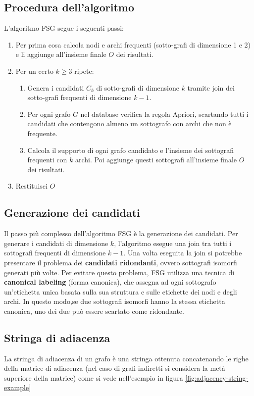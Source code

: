 \subsection{Procedura dell'algoritmo}
L'algoritmo FSG segue i seguenti passi:
\begin{enumerate}
    \item Per prima cosa calcola nodi e archi frequenti (sotto-grafi di dimensione 1 e 2) e li aggiunge all'insieme finale $O$ dei risultati.
    \item Per un certo $k \ge 3$ ripete:
    \begin{enumerate}
        \item Genera i candidati $C_k$ di sotto-grafi di dimensione $k$ tramite join dei sotto-grafi frequenti di dimensione $k-1$.
        \item Per ogni grafo $G$ nel database verifica la regola Apriori, scartando tutti i candidati che contengono almeno un sottografo con archi che non è frequente.
        \item Calcola il supporto di ogni grafo candidato e l'insieme dei sottografi frequenti con $k$ archi. Poi aggiunge  questi sottografi all'insieme finale $O$ dei risultati.
    \end{enumerate}
    \item Restituisci $O$
\end{enumerate}

\subsection{Generazione dei candidati}
Il passo più complesso dell'algoritmo FSG è la generazione dei candidati. Per generare i candidati di dimensione $k$, l'algoritmo esegue una join tra tutti i sottografi frequenti di dimensione $k-1$. Una volta eseguita la join si potrebbe presentare il problema dei \textbf{candidati ridondanti}, ovvero sottografi isomorfi generati più volte. Per evitare questo problema, FSG utilizza una tecnica di \textbf{canonical labeling} (forma canonica), che assegna ad ogni sottografo un'etichetta unica basata sulla sua struttura e sulle etichette dei nodi e degli archi. In questo modo,se due sottografi isomorfi hanno la stessa etichetta canonica, uno dei due può essere scartato come ridondante.

\subsection{Stringa di adiacenza}
La stringa di adiacenza di un grafo è una stringa ottenuta concatenando le righe della matrice di adiacenza (nel caso di grafi indiretti si considera la metà superiore della matrice) come si vede nell'esempio in figura \ref{fig:adjacency-string-example}

